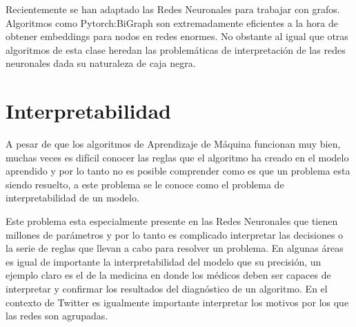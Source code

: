 Recientemente se han adaptado las Redes Neuronales para trabajar con grafos. Algoritmos como Pytorch:BiGraph \cite{lerer_pytorch-biggraph_2019} son extremadamente eficientes a la hora de obtener embeddings para nodos en redes enormes. No obstante al igual que otras algoritmos de esta clase heredan las problemáticas de interpretación de las redes neuronales dada su naturaleza de caja negra.

\section{Interpretabilidad}

A pesar de que los algoritmos de Aprendizaje de Máquina funcionan muy bien, muchas veces es difícil conocer las reglas que el algoritmo ha creado en el modelo aprendido y por lo tanto no es posible comprender como es que un problema esta siendo resuelto, a este problema se le conoce como el problema de interpretabilidad de un modelo. \cite{zhang_survey_2021} \cite{rebala_introduction_2019} 

Este problema esta especialmente presente en las Redes Neuronales que tienen millones de parámetros y por lo tanto es complicado interpretar las decisiones o la serie de reglas que llevan a cabo para resolver un problema. En algunas áreas es igual de importante la interpretabilidad del modelo que su precisión, un ejemplo claro es el de la medicina en donde los médicos deben ser capaces de interpretar y confirmar los resultados del diagnóstico de un algoritmo. En el contexto de Twitter es igualmente importante interpretar los motivos por los que las redes son agrupadas.


